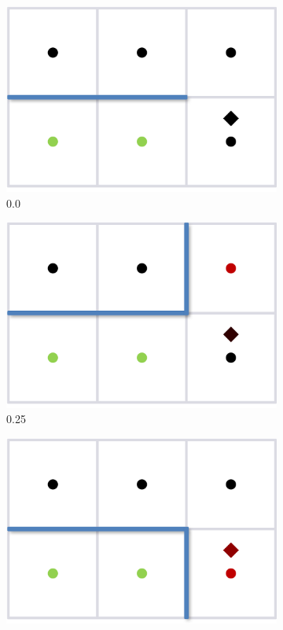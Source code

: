 \begin{figure}
	\begin{subfigure}[b]{0.24\textwidth}
		\includegraphics[width=1.\textwidth]{figures/shade/crossing-edges-1}
		\caption{0.0}
	\end{subfigure}
	\begin{subfigure}[b]{0.24\textwidth}
		\includegraphics[width=1.\textwidth]{figures/shade/crossing-edges-2}
		\caption{0.25}
	\end{subfigure}
	\begin{subfigure}[b]{0.24\textwidth}
		\includegraphics[width=1.\textwidth]{figures/shade/crossing-edges-3}

\end{subfigure}
\end{figure}
